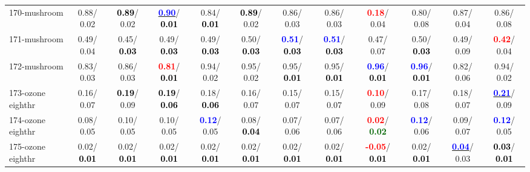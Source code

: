 \begin{table}[h]
\begin{center}
{\begin{tabular}{lc|c|c|c|c|c|c|c|c|c|c}
170-mushroom &   0.88/  0.02 & \textcolor{black}{\textbf{  0.89}}/  0.02 & \underline{\textcolor{blue}{\textbf{  0.90}}}/\textcolor{black}{\textbf{  0.01}} &   0.84/\textcolor{black}{\textbf{  0.01}} & \textcolor{black}{\textbf{  0.89}}/  0.02 &   0.86/  0.03 &   0.86/  0.03 & \textcolor{red}{\textbf{  0.18}}/  0.04 &   0.80/  0.08 &   0.87/  0.04 &   0.86/  0.08 \\
171-mushroom &   0.49/  0.04 &   0.45/\textcolor{black}{\textbf{  0.03}} &   0.49/\textcolor{black}{\textbf{  0.03}} &   0.49/\textcolor{black}{\textbf{  0.03}} &   0.50/\textcolor{black}{\textbf{  0.03}} & \textcolor{blue}{\textbf{  0.51}}/\textcolor{black}{\textbf{  0.03}} & \textcolor{blue}{\textbf{  0.51}}/\textcolor{black}{\textbf{  0.03}} &   0.47/  0.07 &   0.50/\textcolor{black}{\textbf{  0.03}} &   0.49/  0.09 & \textcolor{red}{\textbf{  0.42}}/  0.04 \\
172-mushroom &   0.83/  0.03 &   0.86/  0.03 & \textcolor{red}{\textbf{  0.81}}/\textcolor{black}{\textbf{  0.01}} &   0.94/  0.02 &   0.95/  0.02 &   0.95/\textcolor{black}{\textbf{  0.01}} &   0.95/\textcolor{black}{\textbf{  0.01}} & \textcolor{blue}{\textbf{  0.96}}/\textcolor{black}{\textbf{  0.01}} & \textcolor{blue}{\textbf{  0.96}}/\textcolor{black}{\textbf{  0.01}} &   0.82/  0.06 &   0.94/  0.02 \\
173-ozone eighthr &   0.16/  0.07 & \textcolor{black}{\textbf{  0.19}}/  0.09 & \textcolor{black}{\textbf{  0.19}}/\textcolor{black}{\textbf{  0.06}} &   0.18/\textcolor{black}{\textbf{  0.06}} &   0.16/  0.07 &   0.15/  0.07 &   0.15/  0.07 & \textcolor{red}{\textbf{  0.10}}/  0.09 &   0.17/  0.08 &   0.18/  0.07 & \underline{\textcolor{blue}{\textbf{  0.21}}}/  0.09 \\
174-ozone eighthr &   0.08/  0.05 &   0.10/  0.05 &   0.10/  0.05 & \textcolor{blue}{\textbf{  0.12}}/  0.05 &   0.08/\textcolor{black}{\textbf{  0.04}} &   0.07/  0.06 &   0.07/  0.06 & \textcolor{red}{\textbf{  0.02}}/\textcolor{darkgreen}{\textbf{  0.02}} & \textcolor{blue}{\textbf{  0.12}}/  0.06 &   0.09/  0.07 & \textcolor{blue}{\textbf{  0.12}}/  0.05 \\ \hline
175-ozone eighthr &   0.02/\textcolor{black}{\textbf{  0.01}} &   0.02/\textcolor{black}{\textbf{  0.01}} &   0.02/\textcolor{black}{\textbf{  0.01}} &   0.02/\textcolor{black}{\textbf{  0.01}} &   0.02/\textcolor{black}{\textbf{  0.01}} &   0.02/\textcolor{black}{\textbf{  0.01}} &   0.02/\textcolor{black}{\textbf{  0.01}} & \textcolor{red}{\textbf{ -0.05}}/\textcolor{black}{\textbf{  0.01}} &   0.02/\textcolor{black}{\textbf{  0.01}} & \underline{\textcolor{blue}{\textbf{  0.04}}}/  0.03 & \textcolor{black}{\textbf{  0.03}}/\textcolor{black}{\textbf{  0.01}} \\

\end{tabular}}
\end{center}
\end{table}
